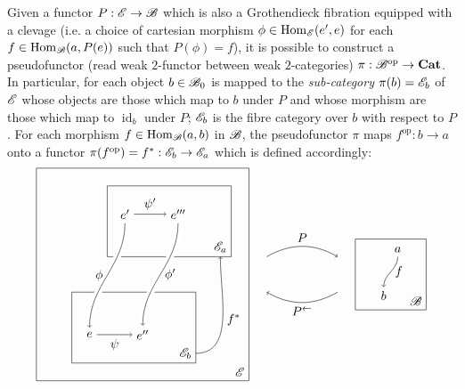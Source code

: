 \documentclass[10pt]{article}
\theoremstyle{definition}
\theoremstyle{remark}
\DeclareMathOperator{\id}{id}
\newcommand{\opcat}{\mathrm{op}}
\DeclareMathOperator{\Hom}{Hom}
\begin{document}
Given a functor $P : \mathscr{E} \to \mathscr{B}$ which is also a Grothendieck fibration equipped with a clevage (i.e. a choice of cartesian morphism $\phi \in \Hom_{\catE}(e', e)$ for each $f \in \Hom_{\catB}(a,P(e))$ such that $P(\phi) = f$), it is possible to construct a pseudofunctor (read weak $2$-functor between weak $2$-categories) $\pi : \catB^{\opcat} \to \mathbf{Cat}$. In particular, for each object $b \in \mathscr{B}_0$ is mapped to the \textit{sub-category} $\pi(b) = \mathscr{E}_b$ of $\mathscr{E}$ whose objects are those which map to $b$ under $P$ and whose morphism are those which map to $\id_{b}$ under $P$; $\mathscr{E}_b$ is the fibre category over $b$ with respect to $P$. For each morphism $f \in \Hom_{\catB}(a,b)$ in $\mathscr{B}$, the pseudofunctor $\pi$ maps $f^{\opcat} : b \to a$ onto a functor $\pi(f^{\opcat}) = f^{\ast} : \catE_{b} \to \catE_{a}$ which is defined accordingly:
\[
    \begin{tikzpicture}
        \begin{scope}[shift={(-4.5,0)}]
            \draw (-3,+3) rectangle (+3,-3) node[above left]{$\catE$};
            \begin{scope}[shift={(-1,+2.5)}]
                \draw (0,0) rectangle (+3.5,-2) node[above left](catEa){$\catE_a$};
                \draw (+0.5, -0.8) node(e2){$e'$};
                \draw (+2, -0.8) node(e4){$e'''$};
                \draw[->] (e2) to node[above]{$\psi'$} (e4);
            \end{scope}
            \begin{scope}[shift={(-2,-0.5)}]
                \draw (0,0) rectangle (+3.5,-2) node[above left](catEb){$\catE_b$};
                \draw (+0.5, -1.2) node(e1){$e$};
                \draw (+2, -1.2) node(e3){$e''$};
                \draw[->] (e1) to node[below]{$\psi$} (e3);
            \end{scope}
            \draw[white, line width=2mm] (e2) to[out=-90,in=+90] (e1);
            \draw[white, line width=2mm] (e4) to[out=-90,in=+90] (e3);
            \draw[->] (e2) to[out=-90,in=+90] node[left ]{$\phi$} (e1);
            \draw[->] (e4) to[out=-90,in=+90] node[right]{$\phi'$} (e3);
            \draw[->] (catEb) to[out=0,in=-90] node[right]{$f^{\ast}$} (catEa);
        \end{scope}
        \begin{scope}[shift={(+1.5,+1)}]
            \draw (0,0) rectangle (+2,-2) node[above left]{$\catB$};
            \draw (+1.2, -0.3) node(a){$a$};
            \draw (+0.8,-1.6) node(b){$b$};
            \draw[->] (a) to[out=-90,in=+90] node[right]{$f$} (b);
        \end{scope}
        \draw[->] (-1,+0.5) to[bend left ] node[above]{$P$} (+1, 0.5);
        \draw[<-] (-1,-0.5) to[bend right] node[below]{$P^{\leftarrow}$} (+1, -0.5);
    \end{tikzpicture}
\]
\end{document}
